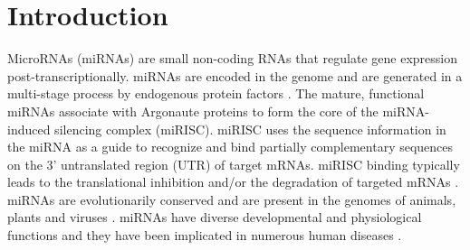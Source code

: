 \documentclass{bmcart}
\begin{document}


\section*{Introduction}
MicroRNAs (miRNAs) are small non-coding RNAs that regulate gene expression post-transcriptionally. miRNAs are encoded in the genome and are generated in a multi-stage process by endogenous protein factors \cite{finnegan2013microrna}. The mature, functional miRNAs associate with Argonaute proteins to form the core of the miRNA-induced silencing complex (miRISC). miRISC uses the sequence information in the miRNA as a guide to recognize and bind partially complementary sequences on the 3' untranslated region (UTR) of target mRNAs. miRISC binding typically leads to the translational inhibition and/or the degradation of targeted mRNAs \cite{huntzinger2011gene}. 
miRNAs are evolutionarily conserved and are present in the genomes of animals, plants and viruses \cite{kozomara2013mirbase}. miRNAs have diverse developmental and physiological functions and they have been implicated in numerous human diseases \cite{rupaimoole2017microrna}.
\end{document}
